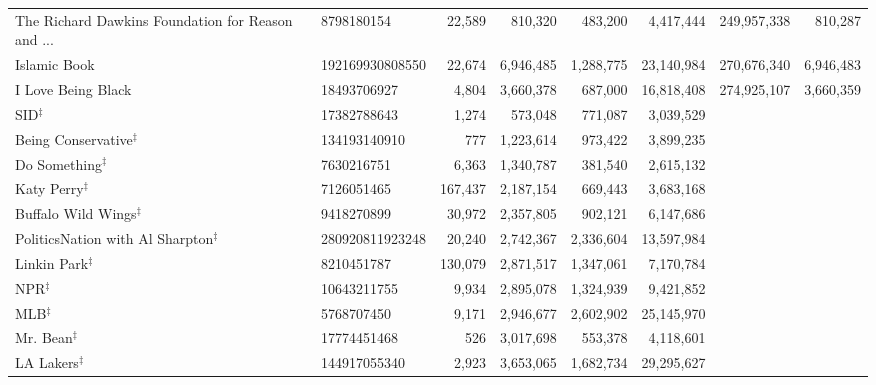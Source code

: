 \begin{longtable}{llrrrrrr}
 The Richard Dawkins Foundation for Reason and ... &       8798180154 &  22,589 &     810,320 &    483,200 &   4,417,444 & 249,957,338 &   810,287 \\
                                      Islamic Book &  192169930808550 &  22,674 &   6,946,485 &  1,288,775 &  23,140,984 & 270,676,340 & 6,946,483 \\
                                I Love Being Black &      18493706927 &   4,804 &   3,660,378 &    687,000 &  16,818,408 & 274,925,107 & 3,660,359 \\
                                    SID$^\ddagger$ &      17382788643 &   1,274 &     573,048 &    771,087 &   3,039,529 &             &           \\
                     Being Conservative$^\ddagger$ &     134193140910 &     777 &   1,223,614 &    973,422 &   3,899,235 &             &           \\
                           Do Something$^\ddagger$ &       7630216751 &   6,363 &   1,340,787 &    381,540 &   2,615,132 &             &           \\
                             Katy Perry$^\ddagger$ &       7126051465 & 167,437 &   2,187,154 &    669,443 &   3,683,168 &             &           \\
                     Buffalo Wild Wings$^\ddagger$ &       9418270899 &  30,972 &   2,357,805 &    902,121 &   6,147,686 &             &           \\
        PoliticsNation with Al Sharpton$^\ddagger$ &  280920811923248 &  20,240 &   2,742,367 &  2,336,604 &  13,597,984 &             &           \\
                            Linkin Park$^\ddagger$ &       8210451787 & 130,079 &   2,871,517 &  1,347,061 &   7,170,784 &             &           \\
                                    NPR$^\ddagger$ &      10643211755 &   9,934 &   2,895,078 &  1,324,939 &   9,421,852 &             &           \\
                                    MLB$^\ddagger$ &       5768707450 &   9,171 &   2,946,677 &  2,602,902 &  25,145,970 &             &           \\
                               Mr. Bean$^\ddagger$ &      17774451468 &     526 &   3,017,698 &    553,378 &   4,118,601 &             &           \\
                              LA Lakers$^\ddagger$ &     144917055340 &   2,923 &   3,653,065 &  1,682,734 &  29,295,627 &             &           \\

\end{longtable}
